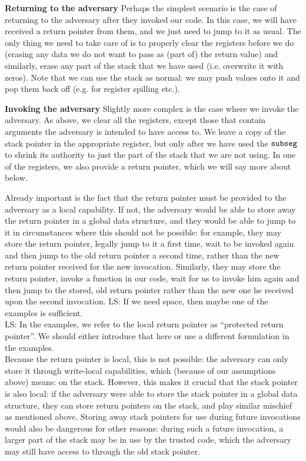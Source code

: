 \documentclass[compsoc,conference,letterpaper,fleqn]{IEEEtran}
\newcommand\lau[1]{{\color{purple} \sf \footnotesize {LS: #1}}\\}
\newcommand{\zinstr}[1]{\mathtt{#1}}
\newcommand{\threeinstr}[4]{
  \ifthenelse{\equal{#2#3#4}{}}
  {\zinstr{#1}}
  {\zinstr{#1} \; #2 \; #3 \; #4}
}
\newcommand{\subseg}[3]{\threeinstr{subseg}{#1}{#2}{#3}}
\begin{document}
\textbf{Returning to the adversary} Perhaps the simplest scenario is the case of
returning to the adversary after they invoked our code. In this case, we will
have received a return pointer from them, and we just need to jump to it as
usual. The only thing we need to take care of is to properly clear the registers
before we do (erasing any data we do not want to pass as (part of) the return
value) and similarly, erase any part of the stack that we have used (i.e.
overwrite it with zeros). Note that we can use the stack as normal: we may push
values onto it and pop them back off (e.g. for register spilling etc.).

\textbf{Invoking the adversary} Slightly more complex is the case where we
invoke the adversary. As above, we clear all the registers, except those that
contain arguments the adversary is intended to have access to. We leave a copy
of the stack pointer in the appropriate register, but only after we have used
the $\subseg{}{}{}$ to shrink its authority to just the part of the stack that
we are not using. In one of the registers, we also provide a return pointer,
which we will say more about below.

Already important is the fact that the return pointer must be provided to the
adversary as a local capability. If not, the adversary would be able to store
away the return pointer in a global data structure, and they would be able to jump
to it in circumstances where this should not be possible: for example, they may
store the return pointer, legally jump to it a first time, wait to be invoked
again and then jump to the old return pointer a second time, rather than the new
return pointer received for the new invocation. Similarly, they may store the
return pointer, invoke a function in our code, wait for us to invoke him again
and then jump to the stored, old return pointer rather than the new one he
received upon the second invocation. \lau{If we need space, then maybe one of the examples is sufficient.}
\lau{In the examples, we refer to the local return pointer as
  ``protected return pointer''. We should either introduce that here
  or use a different formulation in the examples. }

Because the return pointer is local, this is not possible: the adversary can
only store it through write-local capabilities, which (because of our
assumptions above) means: on the stack. However, this makes it crucial that the
stack pointer is also local: if the adversary were able to store the stack
pointer in a global data structure, they can store return pointers on the
stack, and play similar mischief as mentioned above. Storing away stack pointers
for use during future invocations would also be dangerous for other reasons:
during such a future invocation, a larger part of the stack may be in use by the
trusted code, which the adversary may still have access to through the old stack
pointer.
\end{document}
